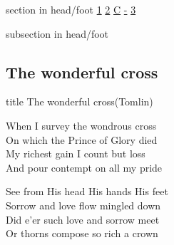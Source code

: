 \documentclass{beamer}
\begin{document}
{
{ 
 {
 \begin{beamercolorbox}[ht=4.5ex,dp=1.5ex,%
      leftskip=.3cm,rightskip=.3cm plus1fil]{section in head/foot}
 \fontsize{12}{25}\selectfont 
\hyperlink{The wonderful cross['When I survey'](Tomlin)1}{1}
\hyperlink{The wonderful cross['When I survey'](Tomlin)2}{2}
\hyperlink{The wonderful cross['When I survey'](Tomlin)C}{C}
\hyperlink{The wonderful cross['When I survey'](Tomlin)-}{-}
\hyperlink{The wonderful cross['When I survey'](Tomlin)3}{3}
 
 \end{beamercolorbox}%
  \begin{beamercolorbox}[ht=2.5ex,dp=1.125ex,%
   leftskip=.3cm,rightskip=.3cm plus1fil]{subsection in head/foot}
   \insertauthor
 \end{beamercolorbox}%
 }
}
\subsection{ The wonderful cross }

\hypertarget{The wonderful cross['When I survey'](Tomlin)}{}
\begin{frame}{}
 \vfill
  \centering
  \begin{beamercolorbox}[sep=8pt,center,shadow=true,rounded=true]{title}
    The wonderful cross(Tomlin)    
  \end{beamercolorbox}
  \vfill
\end{frame}

\hypertarget{The wonderful cross['When I survey'](Tomlin)1}{}
\begin{frame}{}
\fontsize{ 20 }{ 27 }\selectfont

When I survey the wondrous cross\\ 
On which the Prince of Glory died\\ 
My richest gain I count but loss\\ 
And pour contempt on all my pride 

\end{frame}

\hypertarget{The wonderful cross['When I survey'](Tomlin)2}{}
\begin{frame}{}
\fontsize{ 20 }{ 27 }\selectfont

See from His head His hands His feet\\ 
Sorrow and love flow mingled down\\ 
Did e'er such love and sorrow meet\\ 
Or thorns compose so rich a crown 


\end{frame}}
\end{document}
